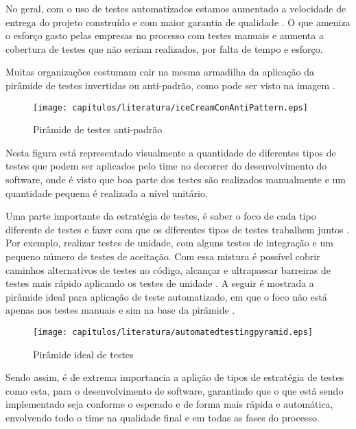 No geral, com o uso de testes automatizados estamos aumentado a velocidade de entrega do projeto construído e com maior garantia de qualidade \cite{James2012}. O que ameniza o esforço gasto pelas empresas no processo com testes manuais e aumenta a cobertura de testes que não seriam realizados, por falta de tempo e esforço.

Muitas organizações costumam cair na mesma armadilha da aplicação da pirâmide de testes invertidas ou anti-padrão, como pode ser visto na imagem \cite{WatirMelon2012}.

\begin{figure}[H]
	\centering
	\captionsetup{justification=centering,margin=2cm}
	\texttt{[image: capitulos/literatura/iceCreamConAntiPattern.eps]}
	\caption{Pirâmide de testes anti-padrão}
	\label{fig:iceCreamConAntiPattern}
\end{figure}

Nesta figura está representado visualmente a quantidade de diferentes tipos de testes que podem ser aplicados pelo time no decorrer do desenvolvimento do software, onde é visto que boa parte dos testes são realizados manualmente e um quantidade pequena é realizada a nível unitário.

Uma parte importante  da estratégia de testes, é  saber o foco de cada tipo diferente de testes e fazer com que os diferentes tipos de testes trabalhem juntos \cite{James2012}. Por exemplo, realizar testes de unidade, com alguns testes de integração e um pequeno número de testes de aceitação. Com essa mistura é possível cobrir caminhos alternativos de testes no código, alcançar e ultrapassar barreiras de testes mais rápido aplicando os testes de unidade \cite{James2012}. A seguir é mostrada a pirâmide ideal para aplicação de teste automatizado, em que o foco não está apenas nos testes manuais e sim na base da pirâmide \cite{James2011}.

\begin{figure}[H]
	\centering
	\captionsetup{justification=centering,margin=2cm}
	\texttt{[image: capitulos/literatura/automatedtestingpyramid.eps]}
	\caption{Pirâmide ideal de testes}
	\label{fig:automatedtestingpyramid}
\end{figure}

Sendo assim, é de extrema importancia a aplição de tipos de estratégia de testes como esta, para o desenvolvimento de software, garantindo que o que está sendo implementado seja conforme o esperado e de forma mais rápida e automática, envolvendo todo o time na qualidade final e em todas as fases do processo. 


